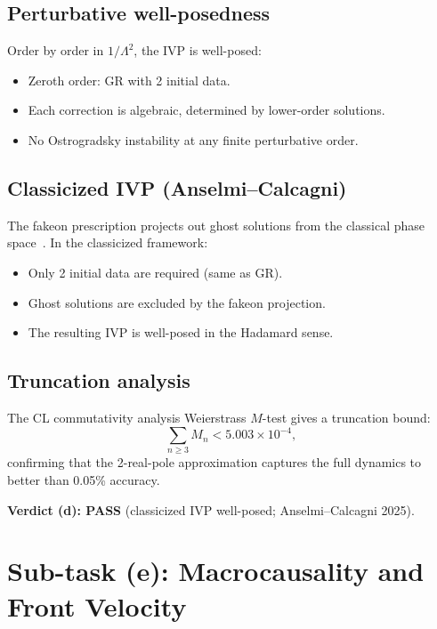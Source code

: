 \documentclass[11pt,a4paper]{article}
\newcommand{\Lam}{\Lambda}
\begin{document}
\subsection{Perturbative well-posedness}

Order by order in $1/\Lam^2$, the IVP is well-posed:
\begin{itemize}[nosep]
  \item Zeroth order: GR with 2 initial data.
  \item Each correction is algebraic, determined by lower-order solutions.
  \item No Ostrogradsky instability at any finite perturbative order.
\end{itemize}

\subsection{Classicized IVP (Anselmi--Calcagni)}

The fakeon prescription projects out ghost solutions from the classical
phase space~\cite{AnselmiCalcagni2025}. In the classicized framework:
\begin{itemize}[nosep]
  \item Only 2 initial data are required (same as GR).
  \item Ghost solutions are excluded by the fakeon projection.
  \item The resulting IVP is well-posed in the Hadamard sense.
\end{itemize}

\subsection{Truncation analysis}

The CL commutativity analysis Weierstrass $M$-test gives a truncation bound:
\begin{equation}
  \sum_{n \geq 3} M_n < 5.003 \times 10^{-4},
\end{equation}
confirming that the 2-real-pole approximation captures the full dynamics to
better than 0.05\% accuracy.

\textbf{Verdict (d): PASS} (classicized IVP well-posed; Anselmi--Calcagni 2025).

\section{Sub-task (e): Macrocausality and Front Velocity}
\label{sec:macrocausality}
\end{document}
